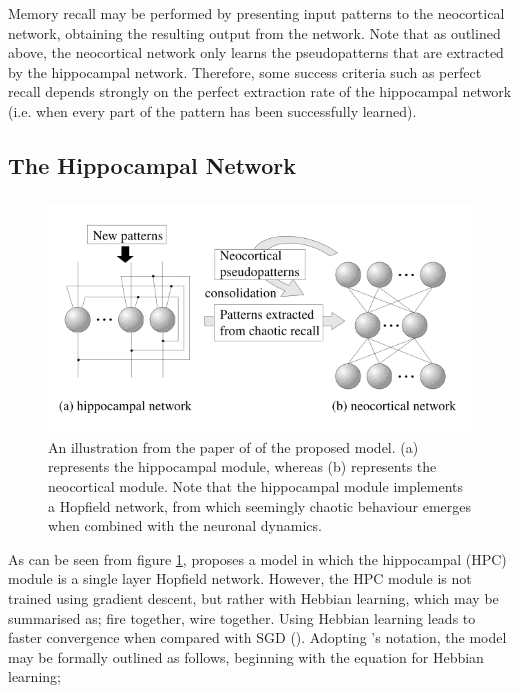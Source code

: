 Memory recall may be performed by presenting input patterns to the neocortical network, obtaining the resulting output from the network. Note that as outlined above, the neocortical network only learns the pseudopatterns that are extracted by the hippocampal network. Therefore, some success criteria such as perfect recall depends strongly on the perfect extraction rate of the hippocampal network (i.e. when every part of the pattern has been successfully learned).

\subsection{The Hippocampal Network}
\subsubsection{\cite{Hattori2010}}
\begin{figure}
\centering
\includegraphics[width=12cm]{fig/hattori2010_model_structure}
\caption{An illustration from the paper of \cite{Hattori2010} of the proposed model. (a) represents the hippocampal module, whereas (b) represents the neocortical module. Note that the hippocampal module implements a Hopfield network, from which seemingly chaotic behaviour emerges when combined with the neuronal dynamics.}
\label{fig:hattori2010_model_structure}
\end{figure}

As can be seen from figure \ref{fig:hattori2010_model_structure}, \cite{Hattori2010} proposes a model in which the hippocampal (HPC) module is a single layer Hopfield network. However, the HPC module is not trained using gradient descent, but rather with Hebbian learning, which may be summarised as; fire together, wire together. Using Hebbian learning leads to faster convergence when compared with SGD (\cite{Hattori2010}). Adopting \cite{Hattori2010}'s notation, the model may be formally outlined as follows, beginning with the equation for Hebbian learning;

